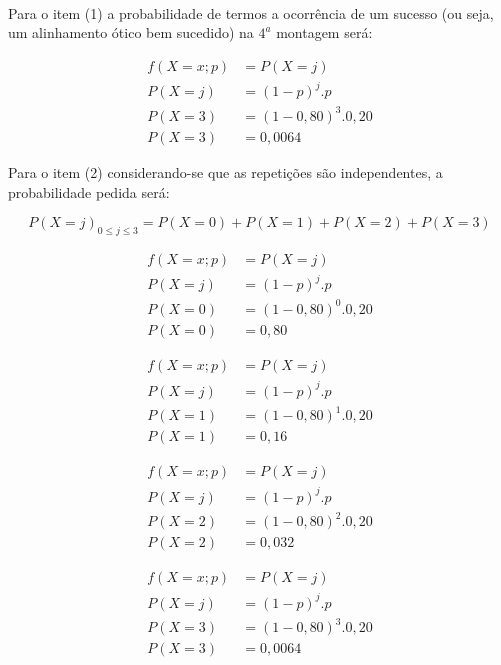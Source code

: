 \documentclass[
]{book}
\begin{document}
~

Para o item (1) a probabilidade de termos a ocorrência de um sucesso (ou seja, um alinhamento ótico bem sucedido) na \(4^{a}\) montagem será:

\hfill\break

\begin{align*}
f(X=x; p) & = P(X=j) \\
P(X=j)  & = (1-p)^{j} . p \\
P(X=3) & = (1-0,80)^{3} . 0,20 \\
P(X=3) & = 0,0064
\end{align*}

\hfill\break

Para o item (2) considerando-se que as repetições são independentes, a probabilidade pedida será:

\hfill\break

\[
P(X=j)_{0 \le j \le 3} = P(X=0) + P(X=1) + P(X=2) + P(X=3)
\]

\hfill\break

\begin{align*}
f(X=x; p) & = P(X=j) \\
P(X=j) & =  (1-p)^{j} . p \\
P(X=0) & =  (1-0,80)^{0} . 0,20 \\
P(X=0) &  =  0,80 
\end{align*}

\hfill\break

\begin{align*}
f(X=x; p) & =  P(X=j) \\
P(X=j) & =  (1-p)^{j} . p \\
P(X=1) & =  (1-0,80)^{1} . 0,20 \\
P(X=1) & = 0,16
\end{align*}

\hfill\break

\begin{align*}
f(X=x; p) & =   P(X=j) \\
P(X=j) & =  (1-p)^{j} . p \\
P(X=2) & =  (1-0,80)^{2} . 0,20 \\
P(X=2) & = 0,032
\end{align*}

\hfill\break

\begin{align*}
f(X=x; p) & =  P(X=j) \\
 P(X=j) & =  (1-p)^{j} . p \\
P(X=3) & =  (1-0,80)^{3} . 0,20 \\
P(X=3) & = 0,0064
\end{align*}
\end{document}
